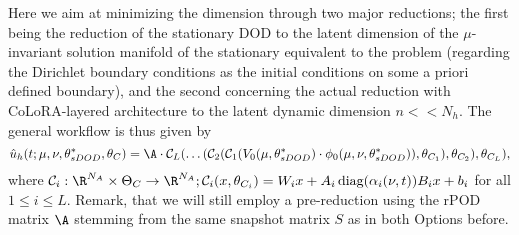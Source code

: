 Here we aim at minimizing the dimension through two major reductions; the first being the reduction of the stationary DOD to the latent dimension of the $\mu$-invariant solution manifold of the stationary equivalent to the problem (regarding the Dirichlet boundary conditions as the initial conditions on some a priori defined boundary), and the second concerning the actual reduction with CoLoRA-layered architecture to the latent dynamic dimension $n << N_h$. The general workflow is thus given by 
\begin{equation}
    \hat{u}_h(t; \mu, \nu, \theta^*_{sDOD}, \theta_{C}) = \A \cdot \mathcal{C}_L( \dots (\mathcal{C}_2(\mathcal{C}_1(V_0(\mu, \theta^*_{sDOD}) \cdot \phi_0(\mu, \nu, \theta^*_{sDOD})), \theta_{C_1}), \theta_{C_2}), \theta_{C_L}),
\end{equation}
where $\mathcal{C}_i: \R^{N_A} \times \Theta_C \to \R^{N_A}; \mathcal{C}_i(x, \theta_{C_i}) = W_i x + A_i \, \text{diag}(\alpha_i(\nu, t)) B_i x + b_i$ for all $1 \leq i \leq L.$
Remark, that we will still employ a pre-reduction using the rPOD matrix $\A$ stemming from the same snapshot matrix $S$ as in both Options before.



